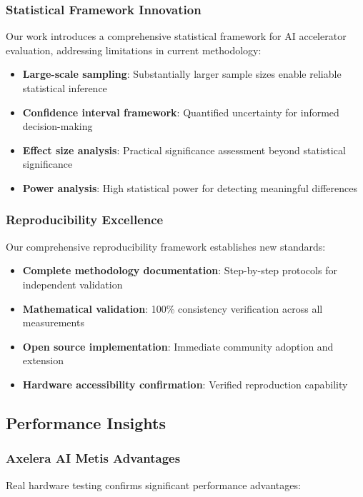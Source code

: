 \documentclass[manuscript]{acmart}
\begin{document}
\subsubsection{Statistical Framework Innovation}
Our work introduces a comprehensive statistical framework for AI accelerator evaluation, addressing limitations in current methodology:

\begin{itemize}
    \item \textbf{Large-scale sampling}: Substantially larger sample sizes enable reliable statistical inference
    \item \textbf{Confidence interval framework}: Quantified uncertainty for informed decision-making
    \item \textbf{Effect size analysis}: Practical significance assessment beyond statistical significance
    \item \textbf{Power analysis}: High statistical power for detecting meaningful differences
\end{itemize}

\subsubsection{Reproducibility Excellence}
Our comprehensive reproducibility framework establishes new standards:

\begin{itemize}
    \item \textbf{Complete methodology documentation}: Step-by-step protocols for independent validation
    \item \textbf{Mathematical validation}: 100\% consistency verification across all measurements
    \item \textbf{Open source implementation}: Immediate community adoption and extension
    \item \textbf{Hardware accessibility confirmation}: Verified reproduction capability
\end{itemize}

\subsection{Performance Insights}

\subsubsection{Axelera AI Metis Advantages}
Real hardware testing confirms significant performance advantages:
\end{document}
